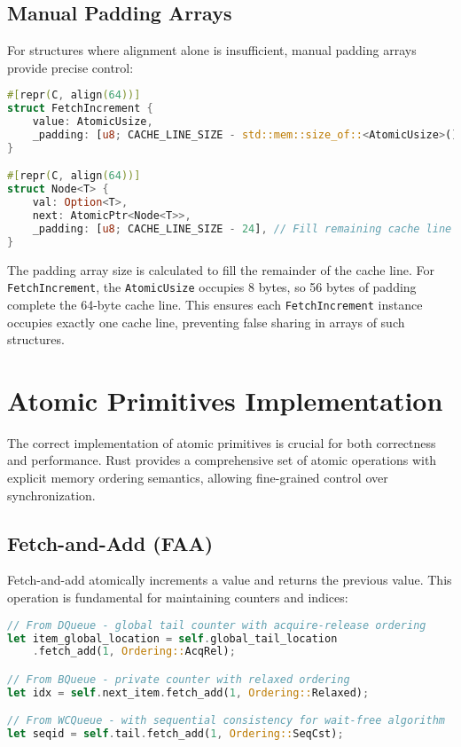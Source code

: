 \subsection{Manual Padding Arrays}

For structures where alignment alone is insufficient, manual padding arrays provide precise control:

\begin{lstlisting}[language=Rust, style=boxed, caption={Manual padding for exact cache line control}, label={lst:manual-padding}]
#[repr(C, align(64))]
struct FetchIncrement {
    value: AtomicUsize,
    _padding: [u8; CACHE_LINE_SIZE - std::mem::size_of::<AtomicUsize>()],
}

#[repr(C, align(64))]
struct Node<T> {
    val: Option<T>,
    next: AtomicPtr<Node<T>>,
    _padding: [u8; CACHE_LINE_SIZE - 24], // Fill remaining cache line
}
\end{lstlisting}

The padding array size is calculated to fill the remainder of the cache line. For \texttt{FetchIncrement}, the \texttt{AtomicUsize} occupies 8 bytes, so 56 bytes of padding complete the 64-byte cache line. This ensures each \texttt{FetchIncrement} instance occupies exactly one cache line, preventing false sharing in arrays of such structures.

\section{Atomic Primitives Implementation}

The correct implementation of atomic primitives is crucial for both correctness and performance. Rust provides a comprehensive set of atomic operations with explicit memory ordering semantics, allowing fine-grained control over synchronization.

\subsection{Fetch-and-Add (FAA)}

Fetch-and-add atomically increments a value and returns the previous value. This operation is fundamental for maintaining counters and indices:

\begin{lstlisting}[language=Rust, style=boxed, caption={Fetch-and-add with different memory orderings}, label={lst:fetch-and-add}]
// From DQueue - global tail counter with acquire-release ordering
let item_global_location = self.global_tail_location
    .fetch_add(1, Ordering::AcqRel);

// From BQueue - private counter with relaxed ordering
let idx = self.next_item.fetch_add(1, Ordering::Relaxed);

// From WCQueue - with sequential consistency for wait-free algorithm
let seqid = self.tail.fetch_add(1, Ordering::SeqCst);
\end{lstlisting}

